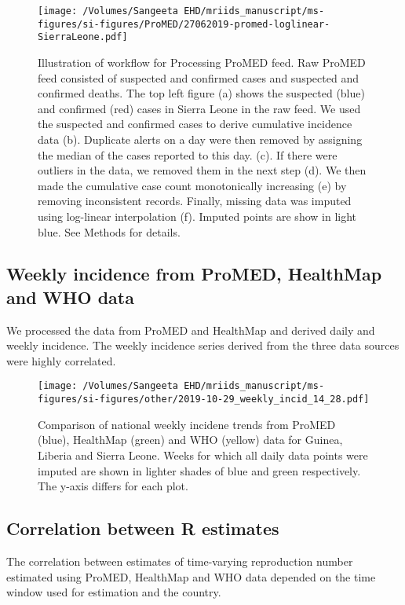 \documentclass[9pt,twoside,lineno]{pnas-new}
\begin{document}
\begin{figure}
  \centering
  \texttt{[image: /Volumes/Sangeeta EHD/mriids\_manuscript/ms-figures/si-figures/ProMED/27062019-promed-loglinear-SierraLeone.pdf]}
  \caption{Illustration of workflow for Processing ProMED feed.
    Raw ProMED feed consisted of suspected and confirmed
    cases and suspected and confirmed
    deaths. The top left figure (a) shows the suspected (blue) and
    confirmed (red) cases in Sierra Leone in the raw feed.
    We used the suspected and confirmed cases to derive cumulative
    incidence data (b). Duplicate alerts on a day were then removed
    by assigning the median of the cases reported to this day.
    (c).
    If there were outliers in the data, we removed them in the next step (d).
    We then made the cumulative case count monotonically increasing (e) by
    removing inconsistent records. Finally, missing data was imputed using
    log-linear interpolation (f). Imputed points are show in light blue.
    See Methods for details.}
\label{fig:dataclean}
\end{figure}\FloatBarrier

\subsection{Weekly incidence from ProMED, HealthMap and WHO data}

We processed the data from ProMED and HealthMap and derived daily and
weekly incidence. The weekly incidence series derived from the three
data sources were highly correlated.

\begin{figure}
  \centering
  \texttt{[image: /Volumes/Sangeeta EHD/mriids\_manuscript/ms-figures/si-figures/other/2019-10-29\_weekly\_incid\_14\_28.pdf]}
  \caption{Comparison of national weekly incidene trends from ProMED (blue),
    HealthMap (green) and WHO (yellow) data for Guinea, Liberia and
    Sierra Leone. Weeks for which all daily data points were imputed
    are shown in lighter shades of blue and green respectively. The
y-axis differs for each plot.}
\label{fig:weekly}
\end{figure}\FloatBarrier


\subsection{Correlation between R estimates}\label{correlation-between-r-estimates}

The correlation between estimates of time-varying reproduction number 
estimated using ProMED, HealthMap and WHO data depended on the
time window used for estimation and the country.
\end{document}
